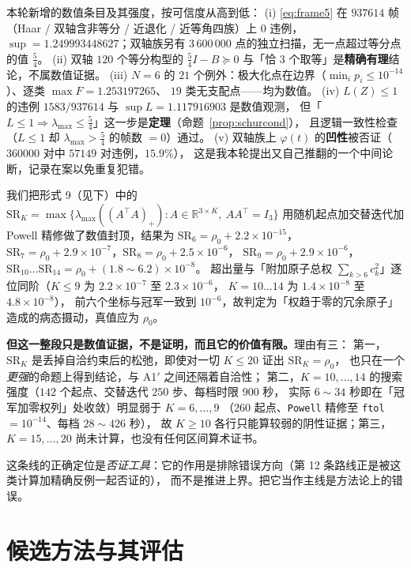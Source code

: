 \documentclass[UTF8,11pt]{ctexart}
\theoremstyle{definition}
\newcommand{\R}{\mathbb{R}}
\begin{document}
本轮新增的数值条目及其强度，按可信度从高到低：
(i) \eqref{eq:frame5} 在 $937614$ 帧（Haar / 双轴含非等分 / 近退化 / 近等角四族）上 $0$ 违例，
$\sup=1.249993448627$；双轴族另有 $3\,600\,000$ 点的独立扫描，无一点超过等分点的值 $\frac54$。
(ii) 双轴 $120$ 个等分构型的 $\frac54I-B\succeq0$ 与「恰 $3$ 个取等」是\textbf{精确有理}结论，不属数值证据。
(iii) $N=6$ 的 $21$ 个例外：极大化点在边界（$\min_ip_i\le10^{-14}$）、逐类 $\max F=1.253197265$、
$19$ 类无支配点——均为数值。
(iv) $L(Z)\le1$ 的违例 $1583/937614$ 与 $\sup L=1.117916903$ 是数值观测，
但「$L\le1\Rightarrow\lambda_{\max}\le\frac54$」这一步是\textbf{定理}（命题~\ref{prop:schurcond}），
且逻辑一致性检查（$L\le1$ 却 $\lambda_{\max}>\frac54$ 的帧数 $=0$）通过。
(v) 双轴族上 $\varphi(t)$ 的\textbf{凹性}被否证（$360000$ 对中 $57149$ 对违例，$15.9\%$），
这是我本轮提出又自己推翻的一个中间论断，记录在案以免重复犯错。

我们把形式 9（见下）中的
$\mathrm{SR}_K=\max\{\lambda_{\max}((A^\top A)_+):A\in\R^{3\times K},\ AA^\top=I_3\}$
用随机起点加交替迭代加 Powell 精修做了数值封顶，结果为
$\mathrm{SR}_6=\rho_0+2.2\times10^{-15}$，
$\mathrm{SR}_7=\rho_0+2.9\times10^{-7}$，$\mathrm{SR}_8=\rho_0+2.5\times10^{-6}$，
$\mathrm{SR}_9=\rho_0+2.9\times10^{-6}$，
$\mathrm{SR}_{10}\dots\mathrm{SR}_{14}=\rho_0+(1.8\sim6.2)\times10^{-8}$。
超出量与「附加原子总权 $\sum_{k>6}c_k^2$」逐位同阶（$K\le9$ 为 $2.2\times10^{-7}$ 至 $2.3\times10^{-6}$，
$K=10\dots14$ 为 $1.4\times10^{-8}$ 至 $4.8\times10^{-8}$），
前六个坐标与冠军一致到 $10^{-6}$，故判定为「权趋于零的冗余原子」造成的病态摄动，真值应为 $\rho_0$。

\textbf{但这一整段只是数值证据，不是证明，而且它的价值有限。}理由有三：
第一，$\mathrm{SR}_K$ 是丢掉自洽约束后的松弛，即使对一切 $K\le20$ 证出 $\mathrm{SR}_K=\rho_0$，
也只在一个\emph{更强}的命题上得到结论，与 A1$'$ 之间还隔着自洽性；
第二，$K=10,\dots,14$ 的搜索强度（$142$ 个起点、交替迭代 $250$ 步、每档时限 $900$ 秒，
实际 $6\sim34$ 秒即在「冠军加零权列」处收敛）明显弱于 $K=6,\dots,9$
（$260$ 起点、\texttt{Powell} 精修至 \texttt{ftol}$=10^{-14}$、每档 $28\sim426$ 秒），
故 $K\ge10$ 各行只能算较弱的阴性证据；第三，$K=15,\dots,20$ 尚未计算，也没有任何区间算术证书。

这条线的正确定位是\emph{否证工具}：它的作用是排除错误方向（第 12 条路线正是被这类计算加精确反例一起否证的），
而不是推进上界。把它当作主线是方法论上的错误。

\section{候选方法与其评估}\label{sec:methods}
\end{document}
